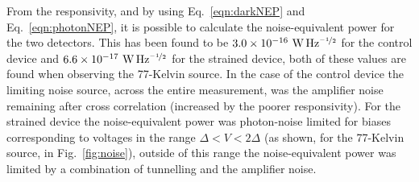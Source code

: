 \documentclass[final]{svjour2}
\begin{document}
From the responsivity, and by using Eq.~\ref{eqn:darkNEP} and Eq.~\ref{eqn:photonNEP}, it is possible to calculate the noise-equivalent power for the two detectors. This has been found to be $3.0 \times 10^{-16}~\mathrm{W\,Hz^{\nicefrac{-1}{2}}}$ for the control device and $6.6\times 10^{-17}~\mathrm{W\,Hz^{\nicefrac{-1}{2}}}$ for the strained device, both of these values are found when observing the 77-Kelvin source. In the case of the control device the limiting noise source, across the entire measurement, was the amplifier noise remaining after cross correlation (increased by the poorer responsivity). For the strained device the noise-equivalent power was photon-noise limited for biases corresponding to voltages in the range $\varDelta < V < 2\varDelta$ (as shown, for the 77-Kelvin source, in Fig.~\ref{fig:noise}), outside of this range the noise-equivalent power was limited by a combination of tunnelling and the amplifier noise.
%
\end{document}
